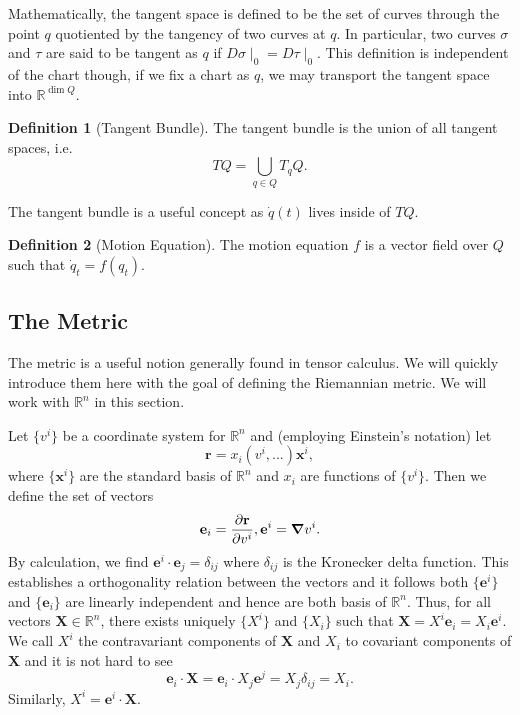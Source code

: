 \documentclass[]{article}
\theoremstyle{definition}
\theoremstyle{definition}
\newtheorem{definition}{Definition}[section]
\begin{document}
Mathematically, the tangent space is defined to be the set of curves through the 
point \(q\) quotiented by the tangency of two curves at \(q\). In particular, 
two curves \(\sigma\) and \(\tau\) are said to be tangent as \(q\) if 
\(D\sigma\mid_0 = D\tau\mid_0\). This definition is independent of the chart 
though, if we fix a chart as \(q\), we may transport the tangent space into 
\(\mathbb{R}^{\dim Q}\). 

\begin{definition}[Tangent Bundle]
  The tangent bundle is the union of all tangent spaces, i.e. 
  \[TQ = \bigcup_{q \in Q} T_q Q.\]
\end{definition}

The tangent bundle is a useful concept as \(\dot q(t)\) lives inside of \(TQ\).

\begin{definition}[Motion Equation]
  The motion equation \(f\) is a vector field over \(Q\) such that 
  \(\dot q_t = f(q_t)\).
\end{definition}

\subsection*{The Metric}

The metric is a useful notion generally found in tensor calculus. We will quickly 
introduce them here with the goal of defining the Riemannian metric. We will 
work with \(\mathbb{R}^n\) in this section.

Let \(\{v^i\}\) be a coordinate system for \(\mathbb{R}^n\) and (employing 
Einstein's notation) let 
\[\mathbf{r} = x_i(v^i, ...) \mathbf{x}^i,\]
where \(\{\mathbf{x}^i\}\) are the standard basis of \(\mathbb{R}^n\) and 
\(x_i\) are functions of \(\{v^i\}\). Then we define the set of vectors 
\[\mathbf{e}_i = \pdv{\mathbf{r}}{v^i}, \mathbf{e}^i = \grad v^i.\]
By calculation, we find \(\mathbf{e}^i \cdot \mathbf{e}_j = \delta_{ij}\) where 
\(\delta_{ij}\) is the Kronecker delta function. This establishes a orthogonality 
relation between the vectors and it follows both \(\{\mathbf{e}^i\}\) and 
\(\{\mathbf{e}_i\}\) are linearly independent and hence are both basis of 
\(\mathbb{R}^n\). Thus, for all vectors \(\mathbf{X} \in \mathbb{R}^n\), there 
exists uniquely \(\{X^i\}\) and \(\{X_i\}\) such that 
\(\mathbf{X} = X^i \mathbf{e}_i = X_i \mathbf{e}^i\). We call \(X^i\) the 
contravariant components of \(\mathbf{X}\) and \(X_i\) to covariant components 
of \(\mathbf{X}\) and it is not hard to see 
\[\mathbf{e}_i \cdot \mathbf{X} = \mathbf{e}_i \cdot X_j \mathbf{e}^j = 
  X_j \delta_{ij} = X_i.\]
Similarly, \(X^i= \mathbf{e}^i \cdot \mathbf{X}\).
\end{document}
